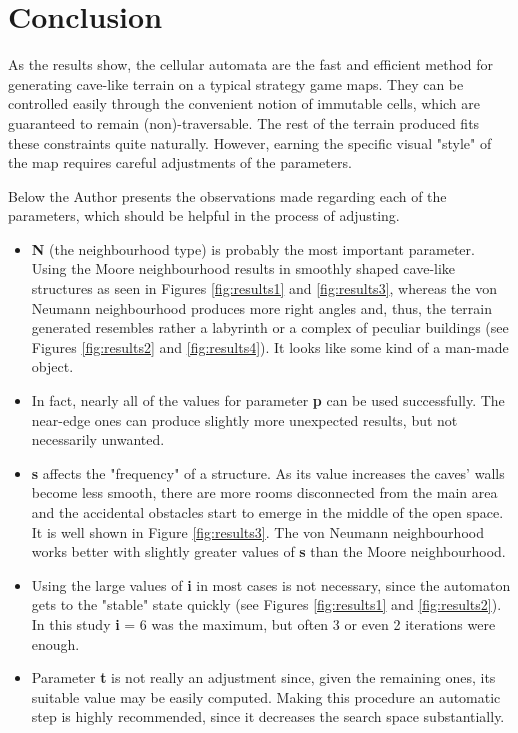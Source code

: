\documentclass[a4paper, 11pt]{article} %
\begin{document}

\section*{Conclusion}

As the results show, the cellular automata are the fast and efficient method for generating cave-like terrain on a typical strategy game maps. They can be controlled easily through the convenient notion of immutable cells, which are guaranteed to remain (non)-traversable. The rest of the terrain produced fits these constraints quite naturally. However, earning the specific visual "style" of the map requires careful adjustments of the parameters.

Below the Author presents the observations made regarding each of the parameters, which should be helpful in the process of adjusting.

\begin{itemize}
        \item \textbf{N} (the neighbourhood type) is probably the most important parameter. Using the Moore neighbourhood results in smoothly shaped cave-like structures as seen in Figures \ref{fig:results1} and \ref{fig:results3}, whereas the von Neumann neighbourhood produces more right angles and, thus, the terrain generated resembles rather a labyrinth or a complex of peculiar buildings (see Figures \ref{fig:results2} and \ref{fig:results4}). It looks like some kind of a man-made object. 
	\item In fact, nearly all of the values for parameter \textbf{p} can be used successfully. The near-edge ones can produce slightly more unexpected results, but not necessarily unwanted.
	\item \textbf{s} affects the "frequency" of a structure. As its value increases the caves' walls become less smooth, there are more rooms disconnected from the main area and the accidental obstacles start to emerge in the middle of the open space. It is well shown in Figure \ref{fig:results3}. The von Neumann neighbourhood works better with slightly greater values of \textbf{s} than the Moore neighbourhood.
	\item Using the large values of \textbf{i} in most cases is not necessary, since the automaton gets to the "stable" state quickly (see Figures \ref{fig:results1} and \ref{fig:results2}). In this study \textbf{i} = 6 was the maximum, but often 3 or even 2 iterations were enough.
        \item Parameter \textbf{t} is not really an adjustment since, given the remaining ones, its suitable value may be easily computed. Making this procedure an automatic step is highly recommended, since it decreases the search space substantially.
\end{itemize}
\end{document}
